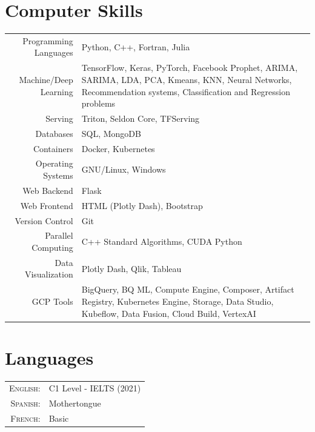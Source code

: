 \documentclass[a4paper,10pt]{article} %
\begin{document}
\begin{tabular}{r|p{14.5cm}}
	
\end{tabular}


\section{Computer Skills}
\bigskip
\begin{tabular}{r|p{10.5cm}}
	Programming Languages & Python, C++, Fortran, Julia \\
	Machine/Deep Learning & TensorFlow, Keras, PyTorch, Facebook Prophet, ARIMA, SARIMA, LDA, PCA, Kmeans, KNN, Neural Networks, Recommendation systems, Classification and Regression problems\\
	Serving & Triton, Seldon Core, TFServing \\
	Databases & SQL, MongoDB \\
	Containers & Docker, Kubernetes \\
	Operating Systems & GNU/Linux, Windows \\
	Web Backend & Flask \\
	Web Frontend & HTML (Plotly Dash), Bootstrap \\
	Version Control & Git \\
	Parallel Computing & C++ Standard Algorithms, CUDA Python\\
	Data Visualization & Plotly Dash, Qlik, Tableau \\
	GCP Tools & BigQuery, BQ ML, Compute Engine, Composer, Artifact Registry, Kubernetes Engine, Storage, Data Studio, Kubeflow, Data Fusion, Cloud Build, VertexAI
\end{tabular}

\section{Languages}
\bigskip
\begin{tabular}{rl}
	\textsc{English:} & C1 Level - IELTS (2021)\\
	\textsc{Spanish:} & Mothertongue \\
	\textsc{French:} & Basic
\end{tabular}
\end{document}
